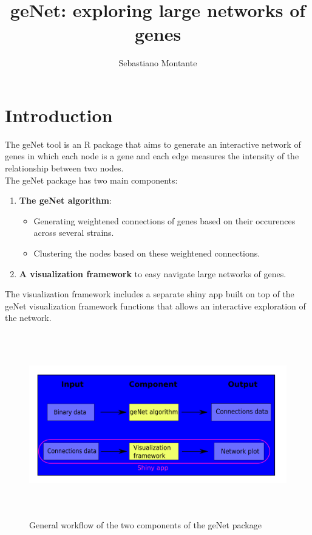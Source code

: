 \documentclass{article}
\begin{document}
\title{geNet: exploring large networks of genes}
\author{Sebastiano Montante}
\maketitle
{}
\tableofcontents
\newpage






\section{Introduction}
The geNet tool is an R package that aims to generate an interactive network of genes in which each node is a gene and each edge measures the intensity of the relationship between two nodes.\\
The geNet package has two main components:
\begin{enumerate}
   	    	\item \textbf{The geNet algorithm}:
   	    	\begin{itemize}
   	    		\item Generating weightened connections of genes based on their occurences across several strains.
   	    		\item Clustering the nodes based on these weightened connections.
   	    	\end{itemize}
   	    	\item \textbf{A visualization framework} to easy navigate large networks of genes.
\end{enumerate}

The visualization framework includes a separate shiny app built on top of the geNet visualization framework functions that allows an interactive exploration of the network.


\begin{figure}[H]
\includegraphics[width=15cm, height=8cm]{./Figures/geNet_package_summary.png}
\centering
\caption{General workflow of the two components of the geNet package}
\label{fig:genetworkflow}
\end{figure}
\end{document}
